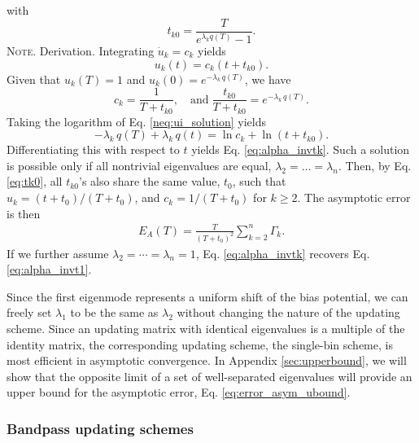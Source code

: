 \documentclass[reprint, superscriptaddress, floatfix]{revtex4-1}
\newcommand{\note}[1]{{\color{DarkGreen}\footnotesize \textsc{Note.} #1}}
\newcommand{\Err}{E}
\begin{document}
with
\begin{equation}
  t_{k0} = \frac{             T            }
                { e^{ \lambda_k q(T) } - 1 }.
\label{eq:tk0}
\end{equation}
%
\note{Derivation.
  Integrating $\dot u_k = c_k$ yields
  \begin{equation}
    u_k(t) = c_k \left(t + t_{k0} \right).
  \tag{UK}
  \label{neq:ui_solution}
  \end{equation}
  Given that $u_k(T) = 1$ and $u_k(0) = e^{-\lambda_k \, q(T)}$,
  we have
  $$
  c_k = \frac{ 1 }{ T + t_{k0} },
  \quad
  \mathrm{and\;}
  \frac{ t_{k0} } { T + t_{k0} }
  =
  e^{ -\lambda_k \, q(T) }.
  $$
  Taking the logarithm of Eq. \eqref{neq:ui_solution} yields
  $$
  -\lambda_k \, q(T) + \lambda_k \, q(t)
  = \ln c_k + \ln \left( t + t_{k0} \right).
  $$
  Differentiating this with respect to $t$ yields
  Eq. \eqref{eq:alpha_invtk}.
}
%
Such a solution is possible only if
all nontrivial eigenvalues are equal,
%
$\lambda_2 = \dots = \lambda_n$.
%
Then, by Eq. \eqref{eq:tk0},
all $t_{k0}$'s also share the same value,
$t_0$,
such that
$u_k = (t + t_0) / (T + t_0)$,
and
$c_k = 1/(T + t_0)$
for $k \ge 2$.
%
The asymptotic error is then
%
\begin{align}
  \Err_A(T)
  =
  \frac{       T     }
       { (T + t_0)^2 }
  \sum_{ k = 2 }^n
    \Gamma_k
  .
\label{eq:error_asym_singlebin}
\end{align}
%
If we further assume $\lambda_2 = \cdots = \lambda_n = 1$,
Eq. \eqref{eq:alpha_invtk}
recovers Eq. \eqref{eq:alpha_invt1}.
%

Since the first eigenmode represents
a uniform shift of the bias potential,
we can freely set $\lambda_1$ to be the same as $\lambda_2$
without changing the nature of the updating scheme.
%
Since an updating matrix
with identical eigenvalues
is a multiple of the identity matrix,
%
the corresponding updating scheme,
the single-bin scheme, is most efficient
in asymptotic convergence.
%
In Appendix \ref{sec:upperbound},
we will show that the opposite limit of
a set of well-separated eigenvalues
will provide an upper bound for
the asymptotic error, Eq. \eqref{eq:error_asym_ubound}.



\subsubsection{\label{sec:optscheme}
Bandpass updating schemes}
\end{document}
